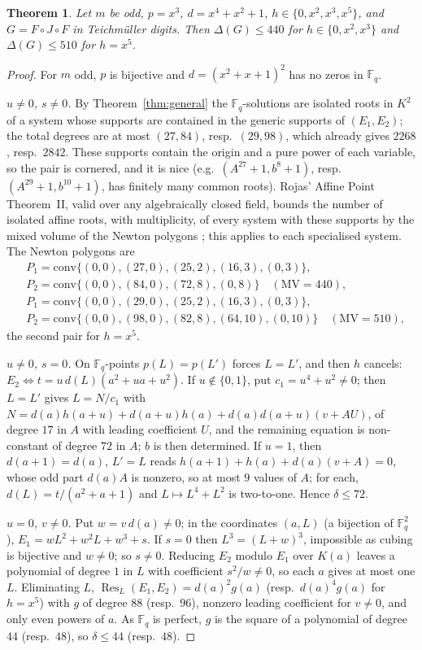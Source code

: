 \documentclass[11pt]{amsart}
\newtheorem{theorem}{Theorem}[section]
\theoremstyle{definition}
\newcommand{\Fq}{\mathbb{F}_q}
\newcommand{\diff}{\delta}
\DeclareMathOperator{\Res}{Res}
\begin{document}
\begin{theorem}\label{thm:family}
Let $m$ be odd, $p=x^3$, $d=x^4+x^2+1$, $h\in\{0,x^2,x^3,x^5\}$, and $G=F\circ J\circ F$ in Teichm\"uller digits. Then
$\Delta(G)\le 440$ for $h\in\{0,x^2,x^3\}$ and $\Delta(G)\le510$ for $h=x^5$.
\end{theorem}
\begin{proof}
For $m$ odd, $p$ is bijective and $d=(x^2+x+1)^2$ has no zeros in $\Fq$.

\emph{$u\ne0$, $s\ne0$.} By Theorem~\ref{thm:general} the $\Fq$-solutions are isolated roots in $K^2$ of a system whose supports are
contained in the generic supports of $(E_1,E_2)$; the total degrees are at most $(27,84)$, resp.\ $(29,98)$, which already gives
$2268$, resp.\ $2842$. These supports contain the origin and a pure power of each variable, so the pair is cornered, and it is nice
(e.g.\ $(A^{27}+1,b^8+1)$, resp.\ $(A^{29}+1,b^{10}+1)$, has finitely many common roots). Rojas' Affine Point Theorem~II, valid over
any algebraically closed field, bounds the number of isolated affine roots, with multiplicity, of every system with these supports by
the mixed volume of the Newton polygons \cite[Affine Point Theorem~II]{Rojas}; this applies to each specialised system. The Newton polygons are
\begin{align*}
&P_1=\mathrm{conv}\{(0,0),(27,0),(25,2),(16,3),(0,3)\},\\ &P_2=\mathrm{conv}\{(0,0),(84,0),(72,8),(0,8)\}\quad(\mathrm{MV}=440),\\
&P_1=\mathrm{conv}\{(0,0),(29,0),(25,2),(16,3),(0,3)\},\\ &P_2=\mathrm{conv}\{(0,0),(98,0),(82,8),(64,10),(0,10)\}\quad(\mathrm{MV}=510),
\end{align*}
the second pair for $h=x^5$.

\emph{$u\ne0$, $s=0$.} On $\Fq$-points $p(L)=p(L')$ forces $L=L'$, and then $h$ cancels:
$E_2\iff t=u\,d(L)(a^2+ua+u^2)$. If $u\notin\{0,1\}$, put $c_1=u^4+u^2\ne0$; then $L=L'$ gives $L=N/c_1$ with
$N=d(a)h(a+u)+d(a+u)h(a)+d(a)d(a+u)(v+AU)$, of degree $17$ in $A$ with leading coefficient $U$, and the remaining equation is
non-constant of degree $72$ in $A$; $b$ is then determined. If $u=1$, then $d(a+1)=d(a)$, $L'=L$ reads $h(a+1)+h(a)+d(a)(v+A)=0$, whose
odd part $d(a)A$ is nonzero, so at most $9$ values of $A$; for each, $d(L)=t/(a^2+a+1)$ and $L\mapsto L^4+L^2$ is two-to-one. Hence
$\diff\le72$.

\emph{$u=0$, $v\ne0$.} Put $w=v\,d(a)\ne0$; in the coordinates $(a,L)$ (a bijection of $\Fq^2$),
$E_1=wL^2+w^2L+w^3+s$. If $s=0$ then $L^3=(L+w)^3$, impossible as cubing is bijective and $w\ne0$; so $s\ne0$. Reducing $E_2$ modulo $E_1$
over $K(a)$ leaves a polynomial of degree $1$ in $L$ with coefficient $s^2/w\ne0$, so each $a$ gives at most one $L$. Eliminating $L$,
$\Res_L(E_1,E_2)=d(a)^{2}g(a)$ (resp.\ $d(a)^4g(a)$ for $h=x^5$) with $g$ of degree $88$ (resp.\ $96$), nonzero leading coefficient for
$v\ne0$, and only even powers of $a$. As $\Fq$ is perfect, $g$ is the square of a polynomial of degree $44$ (resp.\ $48$), so
$\diff\le44$ (resp.\ $48$).
\end{proof}
\end{document}

